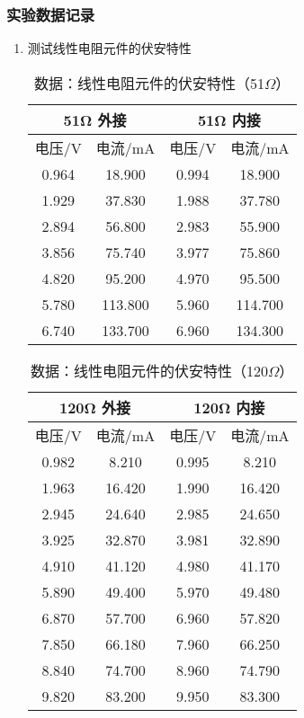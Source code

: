 \documentclass[dvipsnames, svgnames,a4paper,11pt]{article}
\begin{document}
	\subsubsection{实验数据记录}
	\begin{enumerate}
		\item 测试线性电阻元件的伏安特性
		
		\begin{table}[htbp]
			\centering
			\caption{数据：线性电阻元件的伏安特性（51$\Omega$）}
			\begin{tabular}{|c|c|c|c|}
				\hline
				\multicolumn{2}{|c|}{51Ω 外接} & \multicolumn{2}{c|}{51Ω 内接} \\
				\hline
				电压/V & 电流/mA & 电压/V & 电流/mA \\
				\hline
				0.964 & 18.900 & 0.994 & 18.900 \\
				1.929 & 37.830 & 1.988 & 37.780 \\
				2.894 & 56.800 & 2.983 & 55.900 \\
				3.856 & 75.740 & 3.977 & 75.860 \\
				4.820 & 95.200 & 4.970 & 95.500 \\
				5.780 & 113.800 & 5.960 & 114.700 \\
				6.740 & 133.700 & 6.960 & 134.300 \\
				\hline
			\end{tabular}%
			\label{tab:tab1}%
		\end{table}%
		
		\begin{table}[htbp]
			\centering
			\caption{数据：线性电阻元件的伏安特性（120$\Omega$）}
			\begin{tabular}{|c|c|c|c|}
				\hline
				\multicolumn{2}{|c|}{120Ω 外接} & \multicolumn{2}{c|}{120Ω 内接} \\
				\hline
				电压/V & 电流/mA & 电压/V & 电流/mA \\
				\hline
				0.982 & 8.210 & 0.995 & 8.210 \\
				1.963 & 16.420 & 1.990 & 16.420 \\
				2.945 & 24.640 & 2.985 & 24.650 \\
				3.925 & 32.870 & 3.981 & 32.890 \\
				4.910 & 41.120 & 4.980 & 41.170 \\
				5.890 & 49.400 & 5.970 & 49.480 \\
				6.870 & 57.700 & 6.960 & 57.820 \\
				7.850 & 66.180 & 7.960 & 66.250 \\
				8.840 & 74.700 & 8.960 & 74.790 \\
				9.820 & 83.200 & 9.950 & 83.300 \\
				\hline
			\end{tabular}%
			\label{tab:tab2}%
		\end{table}%
		

\end{enumerate}
\end{document}
